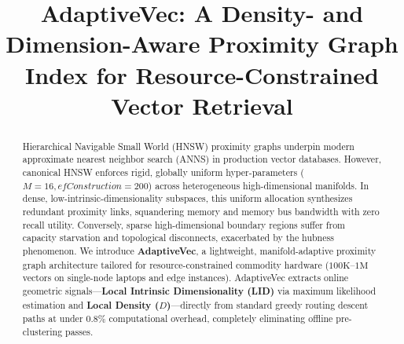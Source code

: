\documentclass[conference,10pt]{IEEEtran}
\begin{document}
\title{AdaptiveVec: A Density- and Dimension-Aware Proximity Graph Index for Resource-Constrained Vector Retrieval}

\author{
}

\maketitle

\begin{abstract}
Hierarchical Navigable Small World (HNSW) proximity graphs underpin modern approximate nearest neighbor search (ANNS) in production vector databases. However, canonical HNSW enforces rigid, globally uniform hyper-parameters ($M=16, efConstruction=200$) across heterogeneous high-dimensional manifolds. In dense, low-intrinsic-dimensionality subspaces, this uniform allocation synthesizes redundant proximity links, squandering memory and memory bus bandwidth with zero recall utility. Conversely, sparse high-dimensional boundary regions suffer from capacity starvation and topological disconnects, exacerbated by the hubness phenomenon. We introduce \textbf{AdaptiveVec}, a lightweight, manifold-adaptive proximity graph architecture tailored for resource-constrained commodity hardware ($100\text{K}$--$1\text{M}$ vectors on single-node laptops and edge instances). AdaptiveVec extracts online geometric signals---\textbf{Local Intrinsic Dimensionality (LID)} via maximum likelihood estimation and \textbf{Local Density ($D$)}---directly from standard greedy routing descent paths at under $0.8\%$ computational overhead, completely eliminating offline pre-clustering passes. 


\end{abstract}
\end{document}

